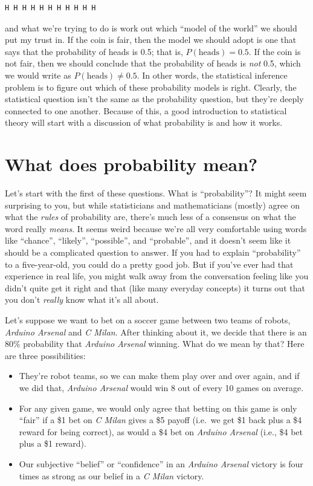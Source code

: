 \documentclass[
  11pt,
  a4paper,
  twoside,symmetric,openright]{book}
\providecommand{\tightlist}{%
  \setlength{\itemsep}{0pt}\setlength{\parskip}{0pt}}
\theoremstyle{break}
\theoremstyle{break}
\begin{document}
\begin{verbatim}
H H H H H H H H H H H
\end{verbatim}

and what we're trying to do is work out which ``model of the world'' we should put my trust in. If the coin is fair, then the model we should adopt is one that says that the probability of heads is 0.5; that is, \(P(\mbox{heads}) = 0.5\). If the coin is not fair, then we should conclude that the probability of heads is \emph{not} 0.5, which we would write as \(P(\mbox{heads}) \neq 0.5\). In other words, the statistical inference problem is to figure out which of these probability models is right. Clearly, the statistical question isn't the same as the probability question, but they're deeply connected to one another. Because of this, a good introduction to statistical theory will start with a discussion of what probability is and how it works.

\section{What does probability mean?}\label{probabilitymeaning}

Let's start with the first of these questions. What is ``probability''? It might seem surprising to you, but while statisticians and mathematicians (mostly) agree on what the \emph{rules} of probability are, there's much less of a consensus on what the word really \emph{means}. It seems weird because we're all very comfortable using words like ``chance'', ``likely'', ``possible'', and ``probable'', and it doesn't seem like it should be a complicated question to answer. If you had to explain ``probability'' to a five-year-old, you could do a pretty good job. But if you've ever had that experience in real life, you might walk away from the conversation feeling like you didn't quite get it right and that (like many everyday concepts) it turns out that you don't \emph{really} know what it's all about.

Let's suppose we want to bet on a soccer game between two teams of robots, \emph{Arduino Arsenal} and \emph{C Milan}. After thinking about it, we decide that there is an 80\% probability that \emph{Arduino Arsenal} winning. What do we mean by that? Here are three possibilities:

\begin{itemize}
\tightlist
\item
  They're robot teams, so we can make them play over and over again, and if we did that, \emph{Arduino Arsenal} would win 8 out of every 10 games on average.
\item
  For any given game, we would only agree that betting on this game is only ``fair'' if a \$1 bet on \emph{C Milan} gives a \$5 payoff (i.e.~we get \$1 back plus a \$4 reward for being correct), as would a \$4 bet on \emph{Arduino Arsenal} (i.e., \$4 bet plus a \$1 reward).
\item
  Our subjective ``belief'' or ``confidence'' in an \emph{Arduino Arsenal} victory is four times as strong as our belief in a \emph{C Milan} victory.
\end{itemize}
\end{document}

